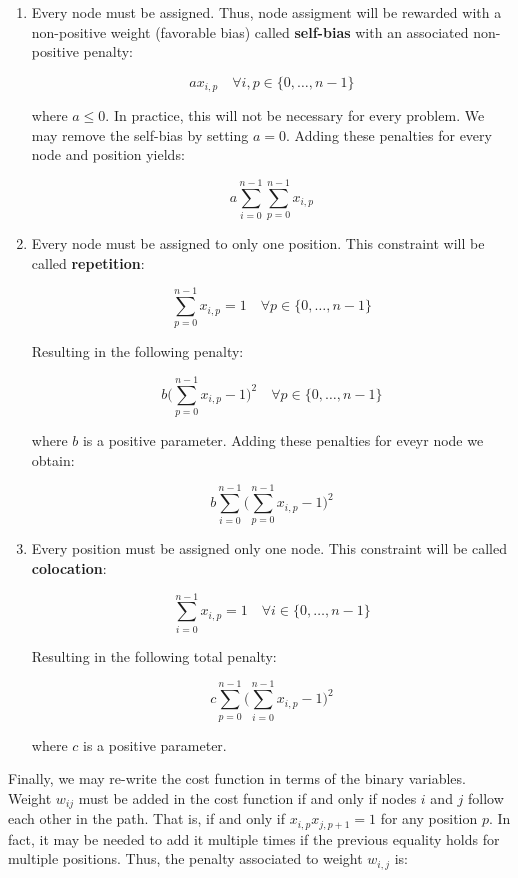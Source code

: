 \begin{enumerate}
	\item Every node must be assigned. Thus, node assigment will be rewarded with a non-positive weight (favorable bias) called \textbf{self-bias} with an associated non-positive penalty:
	
	$$ a x_{i,p} \quad \forall i,p \in \{0, \ldots, n-1\} $$
	
	where $a \leq 0$. In practice, this will not be necessary for every problem. We may remove the self-bias by setting $a=0$. Adding these penalties for every node and position yields:
	
	\begin{equation}
		\label{eqn:salesman-constrain1}
		a \sum_{i=0}^{n-1} \sum_{p=0}^{n-1} x_{i,p}
	\end{equation}
	
	\item Every node must be assigned to only one position. This constraint will be called \textbf{repetition}:
	
	$$ \sum_{p=0}^{n-1} x_{i,p} = 1 \quad \forall p \in \{0, \ldots, n-1\} $$
	
	Resulting in the following penalty:
	
	$$ b \Big( \sum_{p=0}^{n-1} x_{i,p} - 1 \Big)^2 \quad \forall p \in \{0, \ldots, n-1\} $$

	where $b$ is a positive parameter. Adding these penalties for eveyr node we obtain:
	
	\begin{equation}
		\label{eqn:salesman-constrain2}
		b \sum_{i=0}^{n-1} \Big( \sum_{p=0}^{n-1} x_{i,p} - 1 \Big)^2
	\end{equation}
		
	\item Every position must be assigned only one node. This constraint will be called \textbf{colocation}:
	
	$$ \sum_{i=0}^{n-1} x_{i,p} = 1 \quad \forall i \in \{0, \ldots, n-1\} $$
	
	Resulting in the following total penalty:
	
	\begin{equation}
		\label{eqn:salesman-constrain3}
		c \sum_{p=0}^{n-1} \Big( \sum_{i=0}^{n-1} x_{i,p} - 1 \Big)^2
	\end{equation}
	
	where $c$ is a positive parameter.	
\end{enumerate}

Finally, we may re-write the cost function in terms of the binary variables. Weight $w_{ij}$ must be added in the cost function if and only if nodes $i$ and $j$ follow each other in the path. That is, if and only if $x_{i,p}x_{j,p+1} = 1$ for any position $p$. In fact, it may be needed to add it multiple times if the previous equality holds for multiple positions. Thus, the penalty associated to weight $w_{i,j}$ is:


